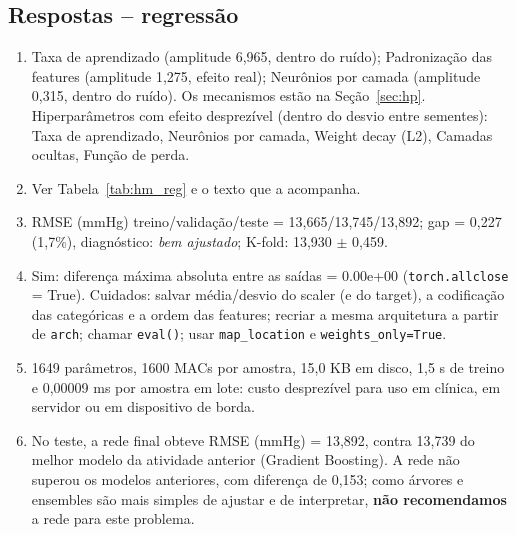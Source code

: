 \documentclass[11pt,a4paper]{article}
\begin{document}
\subsection{Respostas -- regressão}
\begin{enumerate}[label=(\alph*)]
\item Taxa de aprendizado (amplitude 6,965, dentro do ruído); Padronização das features (amplitude 1,275, efeito real); Neurônios por camada (amplitude 0,315, dentro do ruído). Os mecanismos estão na Seção~\ref{sec:hp}. Hiperparâmetros com efeito desprezível (dentro do desvio entre sementes): Taxa de aprendizado, Neurônios por camada, Weight decay (L2), Camadas ocultas, Função de perda. %
\item Ver Tabela~\ref{tab:hm_reg} e o texto que a acompanha.
\item RMSE (mmHg) treino/validação/teste = 13,665/13,745/13,892; gap = 0,227 (1,7\%), diagnóstico: \emph{bem ajustado}; K-fold: 13,930 $\pm$ 0,459.
\item Sim: diferença máxima absoluta entre as saídas = 0.00e+00 (\texttt{torch.allclose} = True). Cuidados: salvar média/desvio do scaler (e do target), a codificação das categóricas e a ordem das features; recriar a mesma arquitetura a partir de \texttt{arch}; chamar \texttt{eval()}; usar \texttt{map\_location} e \texttt{weights\_only=True}.
\item 1649 parâmetros, 1600 MACs por amostra, 15,0 KB em disco, 1,5 s de treino e 0,00009 ms por amostra em lote: custo desprezível para uso em clínica, em servidor ou em dispositivo de borda. %
\item No teste, a rede final obteve RMSE (mmHg) = 13,892, contra 13,739 do melhor modelo da atividade anterior (Gradient Boosting). A rede não superou os modelos anteriores, com diferença de 0,153; como árvores e ensembles são mais simples de ajustar e de interpretar, \textbf{não recomendamos} a rede para este problema. %
\end{enumerate}
\end{document}
